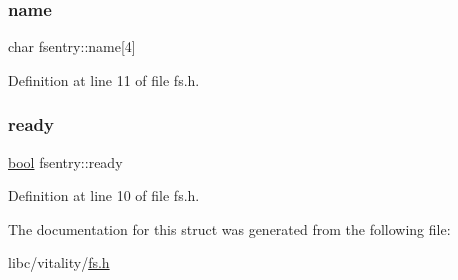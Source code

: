 \mbox{\label{a00226_a9c5a4f5b02eb2c9e9e797f79dc99028a_a9c5a4f5b02eb2c9e9e797f79dc99028a}} 
\subsubsection{\texorpdfstring{name}{name}}
{\footnotesize\ttfamily char fsentry\+::name\mbox{[}4\mbox{]}}



Definition at line 11 of file fs.\+h.

\mbox{\label{a00226_a284522ed97fe1eeebd0fcc039b2ea00a_a284522ed97fe1eeebd0fcc039b2ea00a}} 
\subsubsection{\texorpdfstring{ready}{ready}}
{\footnotesize\ttfamily \hyperlink{a00116_af6a258d8f3ee5206d682d799316314b1_af6a258d8f3ee5206d682d799316314b1}{bool} fsentry\+::ready}



Definition at line 10 of file fs.\+h.



The documentation for this struct was generated from the following file\+:\begin{DoxyCompactItemize}
\item 
libc/vitality/\hyperlink{a00128}{fs.\+h}\end{DoxyCompactItemize}
